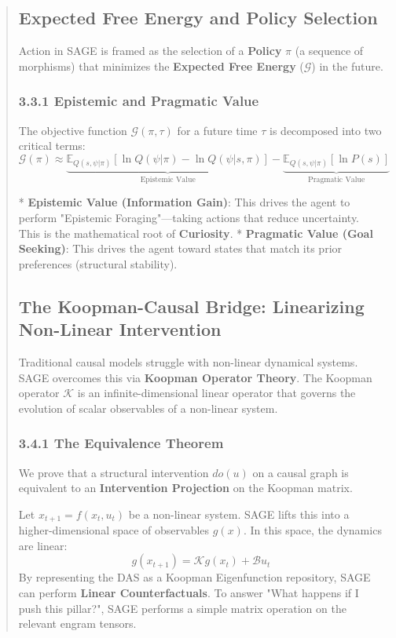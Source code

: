 \documentclass[10pt,twocolumn,letterpaper]{article}
\begin{document}
\begin{abstract}
\subsection{Expected Free Energy and Policy Selection}

Action in SAGE is framed as the selection of a \textbf{Policy} $\pi$ (a sequence of morphisms) that minimizes the \textbf{Expected Free Energy} ($\mathcal{G}$) in the future.

\subsubsection{3.3.1 Epistemic and Pragmatic Value}
The objective function $\mathcal{G}(\pi, \tau)$ for a future time $\tau$ is decomposed into two critical terms:
$$ \mathcal{G}(\pi) \approx \underbrace{\mathbb{E}_{Q(s, \psi | \pi)}[\ln Q(\psi | \pi) - \ln Q(\psi | s, \pi)]}_{\text{Epistemic Value}} - \underbrace{\mathbb{E}_{Q(s, \psi | \pi)}[\ln P(s)]}_{\text{Pragmatic Value}} $$

*   \textbf{Epistemic Value (Information Gain)}: This drives the agent to perform "Epistemic Foraging"—taking actions that reduce uncertainty. This is the mathematical root of \textbf{Curiosity}.
*   \textbf{Pragmatic Value (Goal Seeking)}: This drives the agent toward states that match its prior preferences (structural stability).

\subsection{The Koopman-Causal Bridge: Linearizing Non-Linear Intervention}

Traditional causal models struggle with non-linear dynamical systems. SAGE overcomes this via \textbf{Koopman Operator Theory}. The Koopman operator $\mathcal{K}$ is an infinite-dimensional linear operator that governs the evolution of scalar observables of a non-linear system.

\subsubsection{3.4.1 The Equivalence Theorem}
We prove that a structural intervention $do(u)$ on a causal graph is equivalent to an \textbf{Intervention Projection} on the Koopman matrix. 

Let $x_{t+1} = f(x_t, u_t)$ be a non-linear system. SAGE lifts this into a higher-dimensional space of observables $g(x)$. In this space, the dynamics are linear:
$$ g(x_{t+1}) = \mathcal{K} g(x_t) + \mathcal{B} u_t $$
By representing the DAS as a Koopman Eigenfunction repository, SAGE can perform \textbf{Linear Counterfactuals}. To answer "What happens if I push this pillar?", SAGE performs a simple matrix operation on the relevant engram tensors.


\end{abstract}
\end{document}
